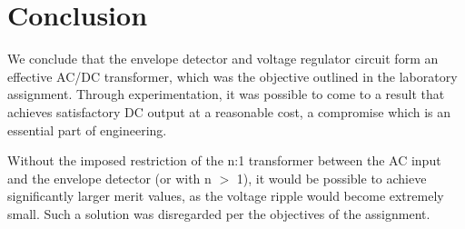 \section{Conclusion}
\label{sec:conclusion}

We conclude that the envelope detector and voltage regulator circuit form an effective AC/DC transformer, which was the objective outlined in the laboratory assignment. Through experimentation, it was possible to come to a result that achieves satisfactory DC output at a reasonable cost, a compromise which is an essential part of engineering.

Without the imposed restriction of the n:1 transformer between the AC input and the envelope detector (or with n $>$ 1), it would be possible to achieve significantly larger merit values, as the voltage ripple would become extremely small. Such a solution was disregarded per the objectives of the assignment.

